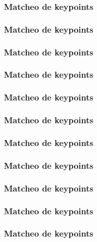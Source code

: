\begin{frame}
	\frametitle{Matcheo de keypoints}
	\footnotesize
	
\end{frame}

\begin{frame}
	\frametitle{Matcheo de keypoints}
	\footnotesize
	
\end{frame}

\begin{frame}
	\frametitle{Matcheo de keypoints}
	\footnotesize
	
\end{frame}

\begin{frame}
	\frametitle{Matcheo de keypoints}
	\footnotesize
	
\end{frame}

\begin{frame}
	\frametitle{Matcheo de keypoints}
	\footnotesize
	
\end{frame}

\begin{frame}
	\frametitle{Matcheo de keypoints}
	\footnotesize
	
\end{frame}

\begin{frame}
	\frametitle{Matcheo de keypoints}
	\footnotesize
	
\end{frame}

\begin{frame}
	\frametitle{Matcheo de keypoints}
	\footnotesize
	
\end{frame}

\begin{frame}
	\frametitle{Matcheo de keypoints}
	\footnotesize
	
\end{frame}

\begin{frame}
	\frametitle{Matcheo de keypoints}
	\footnotesize
	
\end{frame}

\begin{frame}
	\frametitle{Matcheo de keypoints}
	\footnotesize
	
\end{frame}



